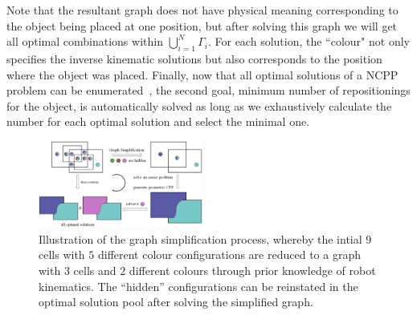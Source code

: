 \documentclass[letterpaper,journal]{IEEEtran}
\begin{document}
Note that the resultant graph does not have physical meaning corresponding to the object being placed at one position, but after solving this graph we will get all optimal combinations within $\bigcup\limits_{i = 1}^N \Gamma_i$. For each solution, the ``colour" not only specifies the inverse kinematic solutions but also corresponds to the position where the object was placed. Finally, now that all optimal solutions of a NCPP problem can be enumerated~\cite{Yang2020Nonrevisiting}, the second goal, minimum number of repositionings for the object, is automatically solved as long as we exhaustively calculate the number for each optimal solution and select the minimal one. 




\begin{figure}[t]
\centering
\includegraphics[width = 0.48\textwidth]{figures/graph_simplification}
\caption{Illustration of the graph simplification process, whereby the intial $9$ cells with $5$ different colour configurations are reduced to a graph with $3$ cells and $2$ different colours through prior knowledge of robot kinematics. The ``hidden'' configurations can be reinstated in the optimal solution pool after solving the simplified graph.}
\label{graph_simplification}
\vspace{-0.1cm}
\end{figure}
\end{document}
